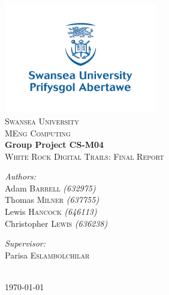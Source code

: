 \begin{titlepage}

\begin{center}
\includegraphics[width=0.5\textwidth]{img/University_Logo}\\

\textsc{\LARGE Swansea University }\\[0.5cm]
\textsc{\large MEng Computing }\\[2cm]

{ \huge \bfseries Group Project CS-M04}\\[0.2cm]
\textsc{\large White Rock Digital Trails: Final Report}\\[1.5cm]

\begin{minipage}{0.4\textwidth}
\begin{flushleft}

\emph{Authors:}\\
Adam \textsc{Barrell} {\scriptsize \emph{(632975)}} \\
Thomas \textsc{Milner} {\scriptsize \emph{(637755)}} \\
Lewis \textsc{Hancock} {\scriptsize \emph{(646113)}} \\
Christopher \textsc{Lewis} {\scriptsize \emph{(636238)}} \\

\end{flushleft}
\end{minipage}
\begin{minipage}{0.4\textwidth}
\begin{flushright}

\emph{Supervisor:}\\
Parisa \textsc{Eslambolchilar}

\end{flushright}
\end{minipage}\\[1.3cm]

{\today}
\end{center}

\end{titlepage}